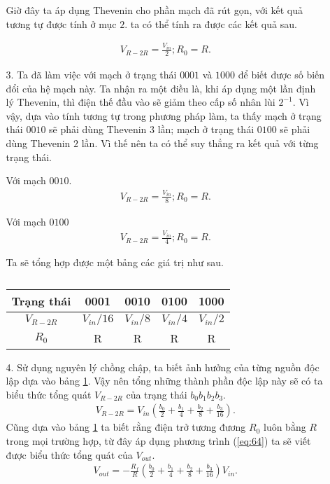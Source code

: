 \begin{center}
\begin{enumerate}[label=(\alph*)]
\begin{enumerate}
    
    Giờ đây ta áp dụng Thevenin cho phần mạch đã rút gọn, với kết quả tương tự được tính ở mục $2.$ ta có thể tính ra được các kết quả sau.
    
    \begin{align}
        V_{R-2R} = \frac{V_{in}}{2} ; R_0 = R.
        \label{eq:72}
    \end{align}
\item[3.]
    Ta đã làm việc với mạch ở trạng thái $0001$ và $1000$ để biết được số biến đổi của hệ mạch này. Ta nhận ra một điều là, khi áp dụng một lần định lý Thevenin, thì điện thế đầu vào sẽ giảm theo cấp số nhân lùi $2^{-1}$. Vì vậy, dựa vào tính tương tự trong phương pháp làm, ta thấy mạch ở trạng thái $0010$ sẽ phải dùng Thevenin $3$ lần; mạch ở trạng thái $0100$ sẽ phải dùng Thevenin $2$ lần. Vì thế nên ta có thể suy thẳng ra kết quả với từng trạng thái.

    Với mạch $0010$.
    \begin{align}
        V_{R-2R}= \frac{V_{in}}{8} ; R_0 = R.
        \label{eq:73}
    \end{align}

    Với mạch $0100$
    \begin{align}
        V_{R-2R}= \frac{V_{in}}{4} ; R_0 = R.
        \label{eq:74}
    \end{align}

    Ta sẽ tổng hợp được một bảng các giá trị như sau. 
    
    \begin{table}[H]
    \centering
    \begin{tabular}{|c|c|c|c|c|}
    \hline
      Trạng thái & 0001 & 0010 & 0100 & 1000 \\ \hline
      $V_{R-2R}$ & $V_{in}/16$ & $V_{in}/8$ & $V_{in}/4$ & $V_{in}/2$ \\ \hline 
      $R_0$ & R & R & R & R \\ \hline
    \end{tabular}
    \caption{}
    \label{Bang muc (c).1}
    \end{table}
    
\item[4.]
    Sử dụng nguyên lý chồng chập, ta biết ảnh hưởng của từng nguồn độc lập dựa vào bảng \ref{Bang muc (c).1}. Vậy nên tổng những thành phần độc lập này sẽ có ta biểu thức tổng quát $V_{R-2R}$ của trạng thái $b_0 b_1 b_2 b_3$.
    \begin{align}
        V_{R-2R}  = V_{in} \left(\frac{b_0}{2} + \frac{b_1}{4} + \frac{b_2}{8} + \frac{b_3}{16} \right).
        \label{eq:75}
    \end{align}
    Cũng dựa vào bảng \ref{Bang muc (c).1} ta biết rằng điện trở tương đương $R_0$ luôn bằng $R$ trong mọi trường hợp, từ đây áp dụng phương trình  (\ref{eq:64}) ta sẽ viết được biểu thức tổng quát của $V_{out}$.
    \begin{align}
    \boxed{
        V_{out} = - \frac{R_f}{R} \left(\frac{b_0}{2} + \frac{b_1}{4} + \frac{b_2}{8} + \frac{b_3}{16} \right)V_{in}.
        }
    \label{eq:76}
    \end{align}
\end{enumerate}



\end{enumerate}
\end{center}
